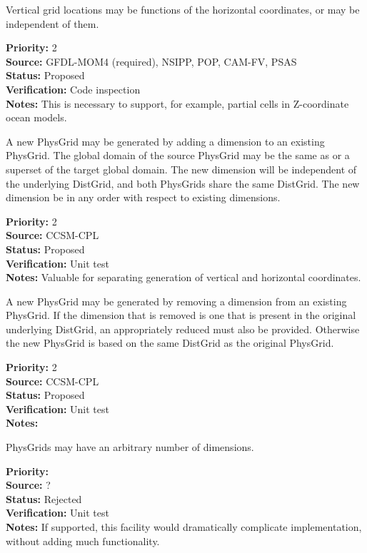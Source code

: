 Vertical grid locations may be functions of the horizontal coordinates, or may be
independent of them.
\begin{reqlist}
{\bf Priority:} 2 \\
{\bf Source:} GFDL-MOM4 (required), NSIPP, POP, 
              CAM-FV, PSAS \\
{\bf Status:} Proposed \\
{\bf Verification:} Code inspection\\
{\bf Notes:} This is necessary to support, for example, partial cells in
Z-coordinate ocean models.
\end{reqlist}

A new PhysGrid may be generated by adding a dimension to an existing PhysGrid.
The global domain of the source PhysGrid may be the same as or a superset of
the target global domain.  The new dimension will be independent of the underlying
DistGrid, and both PhysGrids share the same DistGrid.  The new dimension be in any
order with respect to existing dimensions.
\begin{reqlist}
{\bf Priority:} 2 \\
{\bf Source:} CCSM-CPL \\
{\bf Status:} Proposed \\
{\bf Verification:} Unit test\\
{\bf Notes:} Valuable for separating generation of vertical and horizontal
coordinates.
\end{reqlist}

A new PhysGrid may be generated by removing a dimension from an existing PhysGrid.
If the dimension that is removed is one that is present in the original underlying
DistGrid, an appropriately reduced must also be provided.  Otherwise the new PhysGrid
is based on the same DistGrid as the original PhysGrid.
\begin{reqlist}
{\bf Priority:} 2 \\
{\bf Source:} CCSM-CPL \\
{\bf Status:} Proposed \\
{\bf Verification:} Unit test\\
{\bf Notes:} 
\end{reqlist}

PhysGrids may have an arbitrary number of dimensions. 
\begin{reqlist}
{\bf Priority:} \\
{\bf Source:} ? \\
{\bf Status:} Rejected\\
{\bf Verification:} Unit test\\
{\bf Notes:} If supported, this facility would dramatically complicate implementation,
without adding much functionality.
\end{reqlist}

